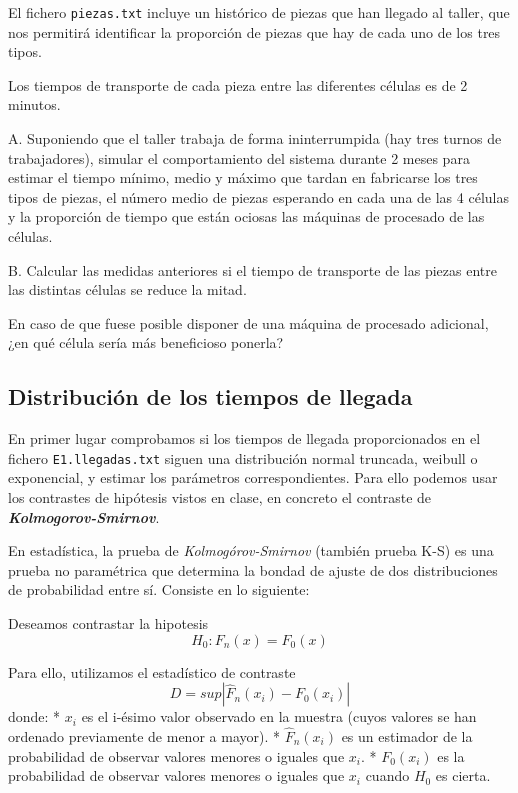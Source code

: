 \documentclass[11pt]{article}
\begin{document}
El fichero \texttt{piezas.txt} incluye un histórico de piezas que han
llegado al taller, que nos permitirá identificar la proporción de piezas
que hay de cada uno de los tres tipos.

Los tiempos de transporte de cada pieza entre las diferentes células es
de 2 minutos.

A. Suponiendo que el taller trabaja de forma ininterrumpida (hay tres
turnos de trabajadores), simular el comportamiento del sistema durante 2
meses para estimar el tiempo mínimo, medio y máximo que tardan en
fabricarse los tres tipos de piezas, el número medio de piezas esperando
en cada una de las 4 células y la proporción de tiempo que están ociosas
las máquinas de procesado de las células.

B. Calcular las medidas anteriores si el tiempo de transporte de las
piezas entre las distintas células se reduce la mitad.

En caso de que fuese posible disponer de una máquina de procesado
adicional, ¿en qué célula sería más beneficioso ponerla?

    \subsection{Distribución de los tiempos de
llegada}\label{distribuciuxf3n-de-los-tiempos-de-llegada}

    En primer lugar comprobamos si los tiempos de llegada proporcionados en
el fichero \texttt{E1.llegadas.txt} siguen una distribución normal
truncada, weibull o exponencial, y estimar los parámetros
correspondientes. Para ello podemos usar los contrastes de hipótesis
vistos en clase, en concreto el contraste de
\textbf{\emph{Kolmogorov-Smirnov}}.

    En estadística, la prueba de \emph{Kolmogórov-Smirnov} (también prueba
K-S) es una prueba no paramétrica que determina la bondad de ajuste de
dos distribuciones de probabilidad entre sí. Consiste en lo siguiente:

    Deseamos contrastar la hipotesis \[H_0: F_n(x) = F_0(x)\]

Para ello, utilizamos el estadístico de contraste
\[D = sup|\hat F_n(x_i) - F_0(x_i)|\] donde: * \(x_i\) es el i-ésimo
valor observado en la muestra (cuyos valores se han ordenado previamente
de menor a mayor). * \(\hat F_n(x_i)\) es un estimador de la
probabilidad de observar valores menores o iguales que \(x_i\). *
\(F_0(x_i)\) es la probabilidad de observar valores menores o iguales
que \(x_i\) cuando \(H_0\) es cierta.
\end{document}
